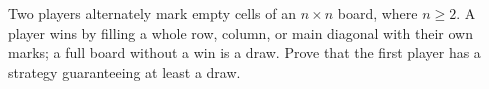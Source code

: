Two players alternately mark empty cells of an $n\times n$ board, where $n\ge2$. A player wins by filling a whole row, column, or main diagonal with their own marks; a full board without a win is a draw. Prove that the first player has a strategy guaranteeing at least a draw.
